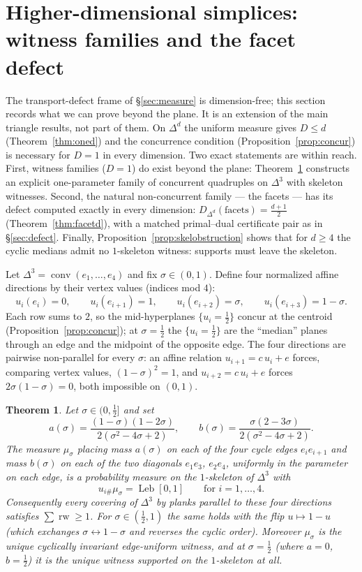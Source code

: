 \documentclass{aims}
\numberwithin{equation}{section}
\theoremstyle{plain}
\newtheorem{theorem}{Theorem}[section]
\theoremstyle{definition}
\theoremstyle{remark}
\newcommand{\rw}{\operatorname{rw}}
\newcommand{\Leb}{\operatorname{Leb}}
\begin{document}
\section{Higher-dimensional simplices: witness families and the facet
defect}\label{sec:simplex3}
The transport-defect frame of \S\ref{sec:measure} is dimension-free; this
section records what we can prove beyond the plane. It is an extension of the
main triangle results, not part of them. On $\Delta^d$ the uniform measure
gives $D\le d$ (Theorem~\ref{thm:oned}) and the concurrence condition
(Proposition~\ref{prop:concur}) is necessary for $D=1$ in every dimension.
Two exact statements are within reach. First, witness families ($D=1$) do
exist beyond the plane: Theorem~\ref{thm:simplex3} constructs an explicit
one-parameter family of concurrent quadruples on $\Delta^3$ with skeleton
witnesses. Second, the natural non-concurrent family --- the facets --- has
its defect computed exactly in every dimension:
$D_{\Delta^d}(\text{facets})=\tfrac{d+1}2$ (Theorem~\ref{thm:facetd}), with a
matched primal--dual certificate pair as in \S\ref{sec:defect}. Finally,
Proposition~\ref{prop:skelobstruction} shows that for $d\ge4$ the cyclic
medians admit no $1$-skeleton witness: supports must leave the skeleton.

Let $\Delta^3=\operatorname{conv}(e_1,\dots,e_4)$ and fix $\sigma\in(0,1)$.
Define four normalized affine directions by their vertex values (indices mod
$4$):
\begin{equation}\label{eq:sigma-family}
u_i(e_i)=0,\qquad u_i(e_{i+1})=1,\qquad u_i(e_{i+2})=\sigma,\qquad
u_i(e_{i+3})=1-\sigma .
\end{equation}
Each row sums to $2$, so the mid-hyperplanes $\{u_i=\tfrac12\}$ concur at the
centroid (Proposition~\ref{prop:concur}); at $\sigma=\tfrac12$ the
$\{u_i=\tfrac12\}$ are the ``median'' planes through an edge and the midpoint of
the opposite edge. The four directions are pairwise non-parallel for every
$\sigma$: an affine relation $u_{i+1}=c\,u_i+e$ forces, comparing vertex values,
$(1-\sigma)^2=1$, and $u_{i+2}=c\,u_i+e$ forces $2\sigma(1-\sigma)=0$, both
impossible on $(0,1)$.

\begin{theorem}\label{thm:simplex3}
Let $\sigma\in(0,\tfrac12]$ and set
\[
a(\sigma)=\frac{(1-\sigma)(1-2\sigma)}{2(\sigma^2-4\sigma+2)},\qquad
b(\sigma)=\frac{\sigma(2-3\sigma)}{2(\sigma^2-4\sigma+2)} .
\]
The measure $\mu_\sigma$ placing mass $a(\sigma)$ on each of the four cycle
edges $e_ie_{i+1}$ and mass $b(\sigma)$ on each of the two diagonals
$e_1e_3$, $e_2e_4$, uniformly in the parameter on each edge, is a probability
measure on the $1$-skeleton of $\Delta^3$ with
\[
u_{i\#}\mu_\sigma=\Leb[0,1]\qquad\text{for }i=1,\dots,4 .
\]
Consequently every covering of $\Delta^3$ by planks parallel to these four
directions satisfies $\sum\rw\ge1$. For $\sigma\in(\tfrac12,1)$ the same holds
with the flip $u\mapsto1-u$ (which exchanges $\sigma\leftrightarrow1-\sigma$ and
reverses the cyclic order). Moreover $\mu_\sigma$ is the unique cyclically
invariant edge-uniform witness, and at $\sigma=\tfrac12$ (where $a=0$,
$b=\tfrac12$) it is the unique witness supported on the $1$-skeleton at all.
\end{theorem}
\end{document}
